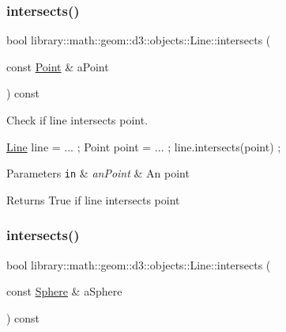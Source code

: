 \subsubsection{\texorpdfstring{intersects()}{intersects()}\hspace{0.1cm}{\footnotesize\ttfamily [1/3]}}
{\footnotesize\ttfamily bool library\+::math\+::geom\+::d3\+::objects\+::\+Line\+::intersects (\begin{DoxyParamCaption}\item[{const \hyperlink{classlibrary_1_1math_1_1geom_1_1d3_1_1objects_1_1_point}{Point} \&}]{a\+Point }\end{DoxyParamCaption}) const}



Check if line intersects point. 


\begin{DoxyCode}
\hyperlink{classlibrary_1_1math_1_1geom_1_1d3_1_1objects_1_1_line_a762e529453ff9ffa9233fd73737f4692}{Line} line = ... ;
Point point = ... ;
line.intersects(point) ;
\end{DoxyCode}



\begin{DoxyParams}[1]{Parameters}
\mbox{\tt in}  & {\em an\+Point} & An point \\
\hline
\end{DoxyParams}
\begin{DoxyReturn}{Returns}
True if line intersects point 
\end{DoxyReturn}
\mbox{\label{classlibrary_1_1math_1_1geom_1_1d3_1_1objects_1_1_line_ab9b35d1e6276d927e9a54219855295ce}} 
\subsubsection{\texorpdfstring{intersects()}{intersects()}\hspace{0.1cm}{\footnotesize\ttfamily [2/3]}}
{\footnotesize\ttfamily bool library\+::math\+::geom\+::d3\+::objects\+::\+Line\+::intersects (\begin{DoxyParamCaption}\item[{const \hyperlink{classlibrary_1_1math_1_1geom_1_1d3_1_1objects_1_1_sphere}{Sphere} \&}]{a\+Sphere }\end{DoxyParamCaption}) const}



